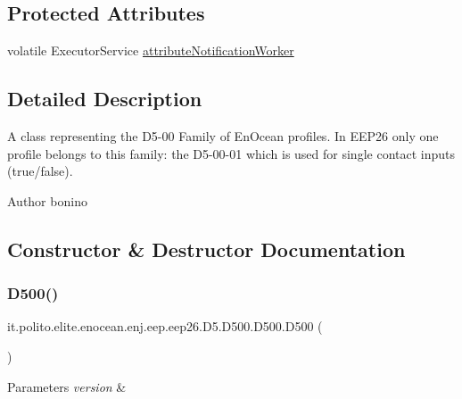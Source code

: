\subsection*{Protected Attributes}
\begin{DoxyCompactItemize}
\item 
volatile Executor\+Service \hyperlink{classit_1_1polito_1_1elite_1_1enocean_1_1enj_1_1eep_1_1eep26_1_1_d5_1_1_d500_1_1_d500_a7e88879803f15bd9ffbb32e953b3a46e}{attribute\+Notification\+Worker}
\end{DoxyCompactItemize}


\subsection{Detailed Description}
A class representing the D5-\/00 Family of En\+Ocean profiles. In E\+E\+P26 only one profile belongs to this family\+: the D5-\/00-\/01 which is used for single contact inputs (true/false).

\begin{DoxyAuthor}{Author}
bonino 
\end{DoxyAuthor}


\subsection{Constructor \& Destructor Documentation}
\hypertarget{classit_1_1polito_1_1elite_1_1enocean_1_1enj_1_1eep_1_1eep26_1_1_d5_1_1_d500_1_1_d500_abf3e46e0ef7ff4e145f7032e0a5449c9}{}\label{classit_1_1polito_1_1elite_1_1enocean_1_1enj_1_1eep_1_1eep26_1_1_d5_1_1_d500_1_1_d500_abf3e46e0ef7ff4e145f7032e0a5449c9} 
\subsubsection{\texorpdfstring{D500()}{D500()}}
{\footnotesize\ttfamily it.\+polito.\+elite.\+enocean.\+enj.\+eep.\+eep26.\+D5.\+D500.\+D500.\+D500 (\begin{DoxyParamCaption}{ }\end{DoxyParamCaption})}


\begin{DoxyParams}{Parameters}
{\em version} & \\
\hline
\end{DoxyParams}



